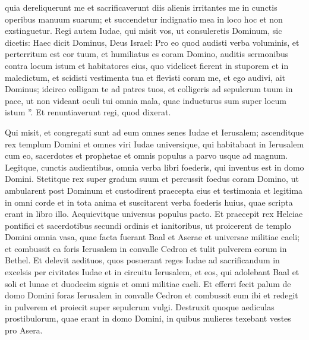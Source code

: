 \begin{biblechapter}
\begin{biblechapter}
\begin{biblechapter}
\begin{biblechapter}
\begin{biblechapter}
\begin{biblechapter}
\begin{biblechapter}
\begin{biblechapter}
\begin{biblechapter}
\begin{biblechapter}
\begin{biblechapter}
\begin{biblechapter}
\begin{biblechapter}
\begin{biblechapter}
\begin{biblechapter}
\begin{biblechapter}
\begin{biblechapter}
\begin{biblechapter}
\begin{biblechapter}
\begin{biblechapter}
\begin{biblechapter}
\begin{biblechapter}
\verse quia dereliquerunt me et sacrificaverunt diis alienis irritantes me in cunctis operibus manuum suarum; et succendetur indignatio mea in loco hoc et non exstinguetur. 
\verse Regi autem Iudae, qui misit vos, ut consuleretis Dominum, sic dicetis: Haec dicit Dominus, Deus Israel: Pro eo quod audisti verba voluminis, 
\verse et perterritum est cor tuum, et humiliatus es coram Domino, auditis sermonibus contra locum istum et habitatores eius, quo videlicet fierent in stuporem et in maledictum, et scidisti vestimenta tua et flevisti coram me, et ego audivi, ait Dominus; 
\verse idcirco colligam te ad patres tuos, et colligeris ad sepulcrum tuum in pace, ut non videant oculi tui omnia mala, quae inducturus sum super locum istum ”. Et renuntiaverunt regi, quod dixerat.
 
\begin{biblechapter}
 \verse Qui misit, et congregati sunt ad eum omnes senes Iudae et Ierusalem; 
\verse ascenditque rex templum Domini et omnes viri Iudae universique, qui habitabant in Ierusalem cum eo, sacerdotes et prophetae et omnis populus a parvo usque ad magnum. Legitque, cunctis audientibus, omnia verba libri foederis, qui inventus est in domo Domini. 
\verse Stetitque rex super gradum suum et percussit foedus coram Domino, ut ambularent post Dominum et custodirent praecepta eius et testimonia et legitima in omni corde et in tota anima et suscitarent verba foederis huius, quae scripta erant in libro illo. Acquievitque universus populus pacto.
 \verse Et praecepit rex Helciae pontifici et sacerdotibus secundi ordinis et ianitoribus, ut proicerent de templo Domini omnia vasa, quae facta fuerant Baal et Aserae et universae militiae caeli; et combussit ea foris Ierusalem in convalle Cedron et tulit pulverem eorum in Bethel. 
\verse Et delevit aedituos, quos posuerant reges Iudae ad sacrificandum in excelsis per civitates Iudae et in circuitu Ierusalem, et eos, qui adolebant Baal et soli et lunae et duodecim signis et omni militiae caeli. 
\verse Et efferri fecit palum de domo Domini foras Ierusalem in convalle Cedron et combussit eum ibi et redegit in pulverem et proiecit super sepulcrum vulgi. 
\verse Destruxit quoque aediculas prostibulorum, quae erant in domo Domini, in quibus mulieres texebant vestes pro Asera.

\end{biblechapter}
\end{biblechapter}
\end{biblechapter}
\end{biblechapter}
\end{biblechapter}
\end{biblechapter}
\end{biblechapter}
\end{biblechapter}
\end{biblechapter}
\end{biblechapter}
\end{biblechapter}
\end{biblechapter}
\end{biblechapter}
\end{biblechapter}
\end{biblechapter}
\end{biblechapter}
\end{biblechapter}
\end{biblechapter}
\end{biblechapter}
\end{biblechapter}
\end{biblechapter}
\end{biblechapter}
\end{biblechapter}
